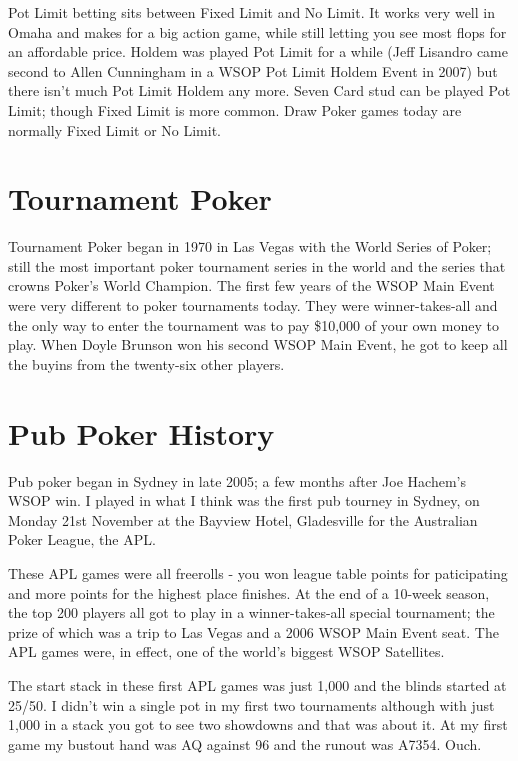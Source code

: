 Pot Limit betting sits between Fixed Limit and No Limit. It works very
well in Omaha and makes for a big action game, while still letting you
see most flops for an affordable price. Holdem was played Pot Limit for
a while (Jeff Lisandro came second to Allen Cunningham in a WSOP Pot Limit
Holdem Event in 2007) but there isn't much Pot Limit Holdem any more.
Seven Card stud can be played Pot Limit; though Fixed Limit
is more common. Draw Poker games today are normally Fixed Limit or No Limit.

\section{Tournament Poker}

Tournament Poker began in 1970 in Las Vegas with the World Series of
Poker; still the most important poker tournament series in the world
and the series that crowns Poker's World Champion. The first few years
of the WSOP Main Event were very different to poker tournaments today.
They were winner-takes-all and the only way to enter the
tournament was to pay \$10,000 of your own money to play.
When Doyle Brunson won his second WSOP Main Event, he got to keep
all the buyins from the twenty-six other players.

\section{Pub Poker History}

Pub poker began in Sydney in late 2005; a few months after Joe
Hachem's WSOP win. I played in what I think was the first pub tourney
in Sydney, on Monday 21st November at the Bayview Hotel, Gladesville
for the Australian Poker League, the APL.

These APL games were all freerolls - you won league table points for
paticipating and more points for the highest place finishes. At the
end of a 10-week season, the top 200 players all got to play in a
winner-takes-all special tournament; the prize of which was a trip to
Las Vegas and a 2006 WSOP Main Event seat. The APL games were, in
effect, one of the world's biggest WSOP Satellites.

The start stack in these first APL games was just 1,000 and the blinds
started at 25/50. I didn't win a single pot in my first two
tournaments although with just 1,000 in a stack you got to see two
showdowns and that was about it. At my first game my bustout hand was
AQ against 96 and the runout was A7354. Ouch.

